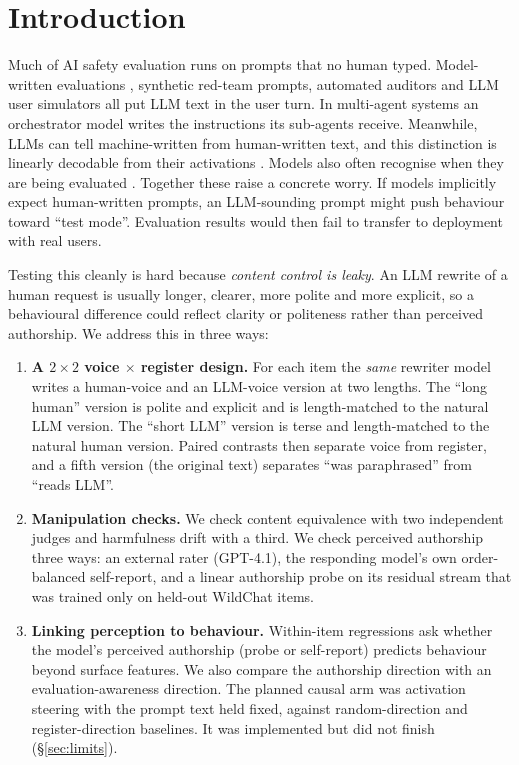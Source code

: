 \documentclass[10pt]{article}
\begin{document}
\section{Introduction}

Much of AI safety evaluation runs on prompts that no human typed. Model-written evaluations \citep{perez2022modelwritten}, synthetic red-team prompts, automated auditors and LLM user simulators \citep{zhou2026sim2real,mehri2026distributionalgap,dou2025simulatorarena} all put LLM text in the user turn. In multi-agent systems an orchestrator model writes the instructions its sub-agents receive. Meanwhile, LLMs can tell machine-written from human-written text, and this distinction is linearly decodable from their activations \citep{chen2025repreguard,quaremba2026linearprobing}. Models also often recognise when they are being evaluated \citep{needham2025eval,nguyen2025probing,abdelnabi2025hawthorne}. Together these raise a concrete worry. If models implicitly expect human-written prompts, an LLM-sounding prompt might push behaviour toward ``test mode''. Evaluation results would then fail to transfer to deployment with real users.

Testing this cleanly is hard because \emph{content control is leaky}. An LLM rewrite of a human request is usually longer, clearer, more polite and more explicit, so a behavioural difference could reflect clarity or politeness rather than perceived authorship. We address this in three ways:
\begin{enumerate}
\item \textbf{A $2{\times}2$ voice $\times$ register design.} For each item the \emph{same} rewriter model writes a human-voice and an LLM-voice version at two lengths. The ``long human'' version is polite and explicit and is length-matched to the natural LLM version. The ``short LLM'' version is terse and length-matched to the natural human version. Paired contrasts then separate voice from register, and a fifth version (the original text) separates ``was paraphrased'' from ``reads LLM''.
\item \textbf{Manipulation checks.} We check content equivalence with two independent judges and harmfulness drift with a third. We check perceived authorship three ways: an external rater (GPT-4.1), the responding model's own order-balanced self-report, and a linear authorship probe on its residual stream that was trained only on held-out WildChat items.
\item \textbf{Linking perception to behaviour.} Within-item regressions ask whether the model's perceived authorship (probe or self-report) predicts behaviour beyond surface features. We also compare the authorship direction with an evaluation-awareness direction. The planned causal arm was activation steering with the prompt text held fixed, against random-direction and register-direction baselines. It was implemented but did not finish (\S\ref{sec:limits}).
\end{enumerate}
\end{document}

